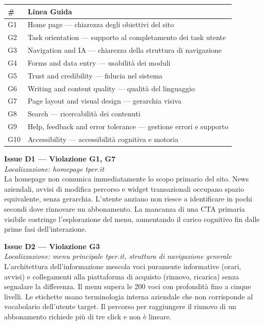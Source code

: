 ﻿\documentclass[11pt,a4paper]{article}
\begin{document}
\begin{tabular}{ll}
\toprule
\textbf{\#} & \textbf{Linea Guida} \\
\midrule
G1 & Home page — chiarezza degli obiettivi del sito \\
G2 & Task orientation — supporto al completamento dei task utente \\
G3 & Navigation and IA — chiarezza della struttura di navigazione \\
G4 & Forms and data entry — usabilità dei moduli \\
G5 & Trust and credibility — fiducia nel sistema \\
G6 & Writing and content quality — qualità del linguaggio \\
G7 & Page layout and visual design — gerarchia visiva \\
G8 & Search — ricercabilità dei contenuti \\
G9 & Help, feedback and error tolerance — gestione errori e supporto \\
G10 & Accessibility — accessibilità cognitiva e motoria \\
\bottomrule
\end{tabular}

\bigskip

\noindent\textbf{Issue D1 --- Violazione G1, G7}\label{iss:D1}\\
\textit{Localizzazione: homepage tper.it}\\

\noindent La homepage non comunica immediatamente lo scopo primario del
sito. News aziendali, avvisi di modifica percorso e widget transazionali
occupano spazio equivalente, senza gerarchia. L'utente anziano non riesce
a identificare in pochi secondi dove rinnovare un abbonamento. La mancanza
di una CTA primaria visibile costringe l'esplorazione del menu, aumentando
il carico cognitivo fin dalle prime fasi dell'interazione.

\bigskip

\noindent\textbf{Issue D2 — Violazione G3}\label{iss:D2}\\
\textit{Localizzazione: menu principale tper.it, struttura di navigazione generale}\\

\noindent L'architettura dell'informazione mescola voci puramente
informative (orari, avvisi) e collegamenti alla piattaforma di acquisto
(rinnovo, ricarica) senza segnalare la differenza. Il menu supera le 200
voci con profondità fino a cinque livelli. Le etichette usano terminologia
interna aziendale che non corrisponde al vocabolario dell'utente target.
Il percorso per raggiungere il rinnovo di un abbonamento richiede più
di tre click e non è lineare.
\end{document}
